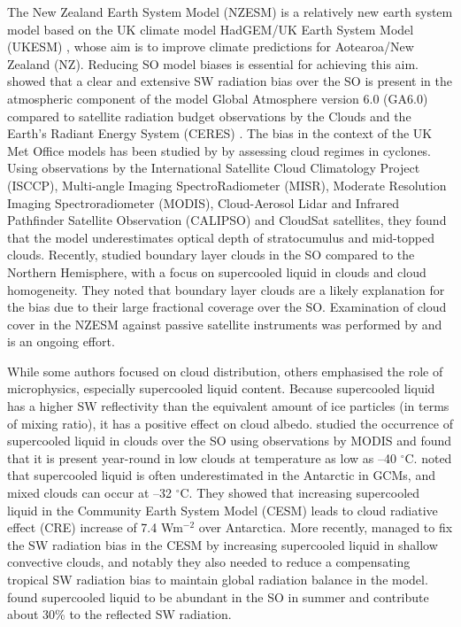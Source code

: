 The New Zealand Earth System Model (NZESM)
is a relatively new earth system model based on the UK climate model HadGEM/UK Earth System Model (UKESM)
\citep{williams2016}, whose aim is to improve climate predictions for
Aotearoa/New Zealand (NZ). Reducing SO model biases is essential for
achieving this aim. \cite{walters2017}
showed that a clear and extensive SW radiation bias over the SO
is present in the atmospheric component of the model Global Atmosphere version 6.0 (GA6.0) compared to satellite
radiation budget observations by the Clouds and the Earth's Radiant Energy
System (CERES) \citep{wielicki1996}. The bias in the context of the UK Met Office
models has been studied by \cite{bodas-salcedo2012} by assessing cloud
regimes in cyclones.
Using observations by the International Satellite Cloud Climatology Project (ISCCP),
Multi-angle Imaging SpectroRadiometer (MISR), Moderate Resolution Imaging Spectroradiometer (MODIS),
Cloud-Aerosol Lidar and Infrared Pathfinder Satellite Observation
(CALIPSO) and CloudSat satellites,
they found that the model underestimates optical depth of stratocumulus and
mid-topped clouds. Recently, \cite{davies2017} studied boundary layer
clouds in the SO compared to the Northern Hemisphere,
with a focus on supercooled liquid in clouds and cloud homogeneity.
They noted that boundary layer clouds are a likely explanation for the bias
due to their large fractional coverage over the SO.
Examination of cloud cover in the NZESM against passive satellite instruments
was performed by \cite{schuddeboom2017,schuddeboom2019} and is an ongoing effort.

While some authors focused on cloud distribution, others
emphasised the role of microphysics, especially supercooled liquid content.
Because supercooled liquid has a higher SW reflectivity than the equivalent amount
of ice particles (in terms of mixing ratio), it has a positive effect on cloud albedo.
\cite{morrison2011} studied the occurrence of supercooled liquid in clouds
over the SO using observations by MODIS and
found that it is present year-round in low clouds at temperature as low as
--40 $^{\circ}$C.
\cite{lawson2014} noted that supercooled liquid is often
underestimated in the Antarctic in GCMs, and mixed clouds can occur at
--32 $^{\circ}$C.
They showed that increasing supercooled liquid in the
Community Earth System Model (CESM) leads to cloud radiative effect (CRE)
increase of 7.4 Wm$^{-2}$ over Antarctica. More recently, \cite{kay2016}
managed to fix the SW radiation bias in the CESM by increasing supercooled liquid
in shallow convective clouds, and notably they also needed to reduce a
compensating tropical SW radiation bias to maintain global radiation balance
in the model.
\cite{bodas-salcedo2016} found supercooled liquid to be abundant in
the SO in summer and contribute about 30\% to the reflected
SW radiation.

